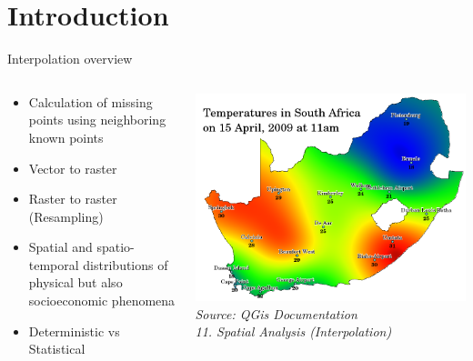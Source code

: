 
\section{Introduction}
\begin{frame}{Interpolation overview}
	\begin{columns}[T] %
		\begin{column}{.52\textwidth}
			\begin{itemize}
				\item Calculation of missing points using neighboring known points
				\item Vector to raster
				\item Raster to raster (Resampling)
				\item Spatial and spatio-temporal distributions of physical but also socioeconomic phenomena
				\item Deterministic vs Statistical
			\end{itemize}
		\end{column}%
		\hfill%
		\begin{column}{.48\textwidth}
			\includegraphics[width=\linewidth]{../writeup/images/temperature_map.png}\\
			\textit{\footnotesize Source: QGis Documentation\\11. Spatial Analysis (Interpolation)}
		\end{column}%
	\end{columns}
\end{frame}
